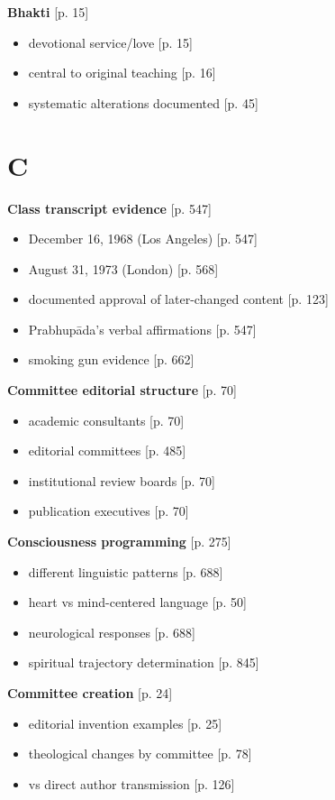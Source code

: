 \documentclass[11pt,twoside]{book}
\begin{document}
\textbf{\textbf{Bhakti}} {[}p. 15]
\begin{itemize}
\item devotional service/love [p. 15]
\item central to original teaching [p. 16]
\item systematic alterations documented [p. 45]
\end{itemize}
\section*{C}
\label{sec:org50bd598}

\textbf{\textbf{Class transcript evidence}} {[}p. 547]
\begin{itemize}
\item December 16, 1968 (Los Angeles) [p. 547]
\item August 31, 1973 (London) [p. 568]
\item documented approval of later-changed content [p. 123]
\item Prabhupāda's verbal affirmations [p. 547]
\item smoking gun evidence [p. 662]
\end{itemize}

\textbf{\textbf{Committee editorial structure}} {[}p. 70]
\begin{itemize}
\item academic consultants [p. 70]
\item editorial committees [p. 485]
\item institutional review boards [p. 70]
\item publication executives [p. 70]
\end{itemize}

\textbf{\textbf{Consciousness programming}} {[}p. 275]
\begin{itemize}
\item different linguistic patterns [p. 688]
\item heart vs mind-centered language [p. 50]
\item neurological responses [p. 688]
\item spiritual trajectory determination [p. 845]
\end{itemize}

\textbf{\textbf{Committee creation}} {[}p. 24]
\begin{itemize}
\item editorial invention examples [p. 25]
\item theological changes by committee [p. 78]
\item vs direct author transmission [p. 126]
\end{itemize}
\end{document}
